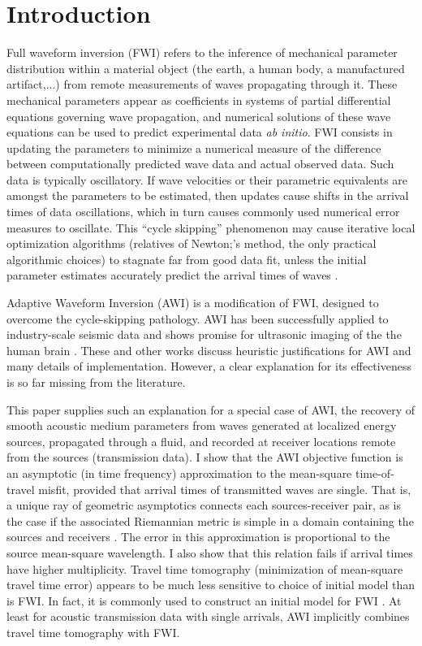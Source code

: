 \section{Introduction}
Full waveform inversion (FWI) refers to the inference of mechanical
parameter distribution within a material object  (the earth, a human
body, a manufactured artifact,...) from remote measurements of waves
propagating through it. These mechanical parameters appear as
coefficients in systems of partial differential equations governing
wave propagation, and numerical solutions of these wave equations can
be used to predict experimental data {\em ab initio}. FWI consists in
updating the parameters to minimize a numerical measure of  the difference between computationally
predicted wave data and actual observed
data. Such data is typically oscillatory. If wave velocities or their parametric equivalents are amongst the parameters
to be estimated, then updates cause shifts in the arrival times of
data oscillations, which in turn causes commonly used numerical error measures
to oscillate. This ``cycle skipping'' phenomenon may cause iterative local optimization algorithms (relatives of
Newton;'s method, the only practical algorithmic choices) to stagnate
far from good data fit, unless the initial
parameter estimates accurately predict the arrival times of waves \cite[]{GauTarVir:86,VirieuxOperto:09,HuetalIEEE:18}.

Adaptive Waveform
Inversion \cite[]{Warner:16} (AWI) is a modification of FWI, designed to overcome the
cycle-skipping pathology. AWI has been successfully applied to
industry-scale seismic data
\cite[]{GuaschWarnerRavaut:GEO19,Warneretal:SEG21} and shows promise
for ultrasonic imaging of the the human brain
\cite[]{Guaschetal:NPJDM20}. These and other works discuss heuristic justifications for AWI
and many details of implementation. However, a clear explanation for its
effectiveness is so far missing from the literature.

This paper supplies such an explanation for a special case of AWI, the
recovery of smooth acoustic medium parameters from waves generated at
localized energy sources, propagated through a fluid, and recorded at
receiver locations remote from the sources (transmission data). I show that the AWI
objective function is an asymptotic (in time frequency) approximation
to the mean-square time-of-travel misfit, provided that arrival times
of transmitted waves are single. That is, a unique ray of geometric
asymptotics connects each sources-receiver pair, as is the case if the associated
Riemannian metric is simple in a domain containing the sources and
receivers \cite[]{PestovUhlmann:05,StefanovUhlmann:05}. The error in
this approximation is proportional to the source mean-square
wavelength. I also show that this relation fails if arrival times have
higher multiplicity. Travel time tomography (minimization of
mean-square travel time error) appears to be much less sensitive to
choice of initial model than is FWI. In fact, it is commonly used to
construct an initial model for FWI
\cite[]{Bordingetal:87,SirguePratt:04,VirieuxOperto:09}. At least for
acoustic transmission data with single arrivals, AWI implicitly
combines travel time tomography with FWI.

